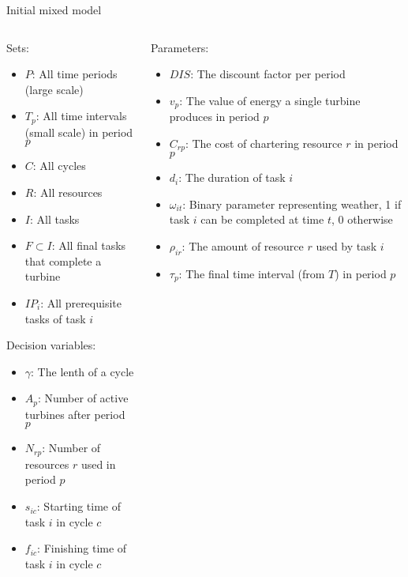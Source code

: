 \documentclass{beamer}
\begin{document}
\begin{frame}{Initial mixed model}
\scriptsize

\begin{columns}
\begin{column}{.48\textwidth}
Sets:
\begin{itemize}
\item $P$: All time periods (large scale)
\item $T_p$: All time intervals (small scale) in period $p$
\item $C$: All cycles
\item $R$: All resources
\item $I$: All tasks
\item $F \subset I$: All final tasks that complete a turbine
\item $IP_i$: All prerequisite tasks of task $i$
\end{itemize}

Decision variables:
\begin{itemize}
\item $\gamma$: The lenth of a cycle
\item $A_{p}$: Number of active turbines after period $p$
\item $N_{rp}$: Number of resources $r$ used in period $p$
\item $s_{ic}$: Starting time of task $i$ in cycle $c$
\item $f_{ic}$: Finishing time of task $i$ in cycle $c$
\end{itemize}
\end{column}

\hfill

\begin{column}{.48\textwidth}
Parameters:
\begin{itemize}
\item $DIS$: The discount factor per period
\item $v_p$: The value of energy a single turbine produces in period $p$
\item $C_{rp}$: The cost of chartering resource $r$ in period $p$
\item $d_i$: The duration of task $i$
\item $\omega_{it}$: Binary parameter representing weather, 1 if task $i$ can be completed at time $t$, 0 otherwise
\item $\rho_{ir}$: The amount of resource $r$ used by task $i$
\item $\tau_p$: The final time interval (from $T$) in period $p$
\end{itemize}
\end{column}
\end{columns}
\end{frame}
\end{document}
